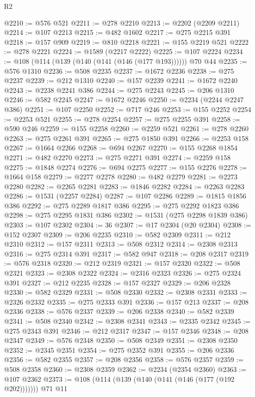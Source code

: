 \begin{lexlean}{R2}
\begin{coremodule}
@2210 := @576 @521
@2211 := @278 @2210
@2213 := @2202 (@2209 @2211)
@2214 := @107 @2213
@2215 := @482 @1602
@2217 := @275 @2215 @391
@2218 := @157 @909
@2219 := @810 @2218
@2221 := @155 @2219 @521
@2222 := @278 @2221
@2224 := @1589 (@2217 @2222)
@2225 := @107 @2224
@2234 := @108 (@114 (@139 (@140 (@141 (@146 (@177 @193)))))) @70 @44
@2235 := @576 @1310
@2236 := @508 @2235
@2237 := @1672 @2236
@2238 := @275 @2237
@2239 := @212 @1310
@2240 := @157 @2239
@2241 := @1672 @2240
@2243 := @2238 @2241 @386
@2244 := @275 @2243
@2245 := @206 @1310
@2246 := @582 @2245
@2247 := @1672 @2246
@2250 := @2234 (@2244 @2247 @386)
@2251 := @107 @2250
@2252 := @717 @246
@2253 := @155 @2252
@2254 := @2253 @521
@2255 := @278 @2254
@2257 := @275 @2255 @391
@2258 := @590 @246
@2259 := @155 @2258
@2260 := @2259 @521
@2261 := @278 @2260
@2263 := @275 @2261 @391
@2265 := @275 @1850 @391
@2266 := @2253 @158
@2267 := @1664 @2266
@2268 := @694 @2267
@2270 := @155 @2268 @1854
@2271 := @482 @2270
@2273 := @275 @2271 @391
@2274 := @2259 @158
@2275 := @1848 @2274
@2276 := @694 @2275
@2277 := @155 @2276
@2278 := @1664 @158
@2279 := @2277 @2278
@2280 := @482 @2279
@2281 := @2273 @2280
@2282 := @2265 @2281
@2283 := @1846 @2282
@2284 := @2263 @2283
@2286 := @1531 (@2257 @2284)
@2287 := @107 @2286
@2289 := @1815 @1856 @386
@2292 := @275 @2289 @1817 @386
@2295 := @275 @2292 @1823 @386
@2298 := @275 @2295 @1831 @386
@2302 := @1531 (@275 @2298 @1839 @386)
@2303 := @107 @2302
@2304 := 36
@2307 := @17 @2304 (@20 @2304)
@2308 := @152 @2307
@2309 := @206 @2235
@2310 := @582 @2309
@2311 := @212 @2310
@2312 := @157 @2311
@2313 := @508 @2312
@2314 := @2308 @2313
@2316 := @275 @2314 @391
@2317 := @582 @947
@2318 := @208 @2317
@2319 := @576 @2318
@2320 := @212 @2319
@2321 := @157 @2320
@2322 := @508 @2321
@2323 := @2308 @2322
@2324 := @2316 @2323
@2326 := @275 @2324 @391
@2327 := @212 @2235
@2328 := @157 @2327
@2329 := @206 @2328
@2330 := @582 @2329
@2331 := @508 @2330
@2332 := @2308 @2331
@2333 := @2326 @2332
@2335 := @275 @2333 @391
@2336 := @157 @213
@2337 := @208 @2336
@2338 := @576 @2337
@2339 := @206 @2338
@2340 := @582 @2339
@2341 := @508 @2340
@2342 := @2308 @2341
@2343 := @2335 @2342
@2345 := @275 @2343 @391
@2346 := @212 @2317
@2347 := @157 @2346
@2348 := @208 @2347
@2349 := @576 @2348
@2350 := @508 @2349
@2351 := @2308 @2350
@2352 := @2345 @2351
@2354 := @275 @2352 @391
@2355 := @206 @2336
@2356 := @582 @2355
@2357 := @208 @2356
@2358 := @576 @2357
@2359 := @508 @2358
@2360 := @2308 @2359
@2362 := @2234 (@2354 @2360)
@2363 := @107 @2362
@2373 := @108 (@114 (@139 (@140 (@141 (@146 (@177 (@192 @202))))))) @71 @11

\end{coremodule}
\end{lexlean}
